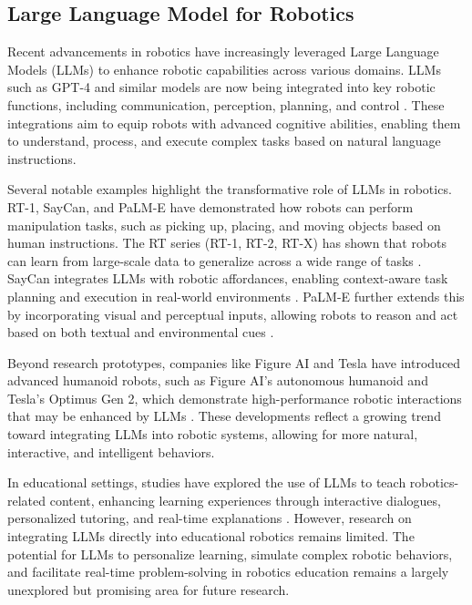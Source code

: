 \subsection{Large Language Model for Robotics}

Recent advancements in robotics have increasingly leveraged Large Language Models (LLMs) to enhance robotic capabilities across various domains. LLMs such as GPT-4 and similar models are now being integrated into key robotic functions, including communication, perception, planning, and control \cite{wang2024large}\cite{kim2024survey}\cite{zeng2023large}. These integrations aim to equip robots with advanced cognitive abilities, enabling them to understand, process, and execute complex tasks based on natural language instructions.

Several notable examples highlight the transformative role of LLMs in robotics. RT-1, SayCan, and PaLM-E have demonstrated how robots can perform manipulation tasks, such as picking up, placing, and moving objects based on human instructions. The RT series (RT-1, RT-2, RT-X) has shown that robots can learn from large-scale data to generalize across a wide range of tasks \cite{DBLP:conf/rss/BrohanBCCDFGHHH23}\cite{pmlr-v229-zitkovich23a}\cite{vuong2023open}. SayCan integrates LLMs with robotic affordances, enabling context-aware task planning and execution in real-world environments \cite{Ahn2022DoAI}. PaLM-E further extends this by incorporating visual and perceptual inputs, allowing robots to reason and act based on both textual and environmental cues \cite{Driess2023PaLMEAE}.

Beyond research prototypes, companies like Figure AI and Tesla have introduced advanced humanoid robots, such as Figure AI’s autonomous humanoid and Tesla’s Optimus Gen 2, which demonstrate high-performance robotic interactions that may be enhanced by LLMs \cite{figure_ai}\cite{tesla_optimus_gen2}. These developments reflect a growing trend toward integrating LLMs into robotic systems, allowing for more natural, interactive, and intelligent behaviors.

In educational settings, studies have explored the use of LLMs to teach robotics-related content, enhancing learning experiences through interactive dialogues, personalized tutoring, and real-time explanations \cite{Kahl2024}\cite{shu2024llms}. However, research on integrating LLMs directly into educational robotics remains limited. The potential for LLMs to personalize learning, simulate complex robotic behaviors, and facilitate real-time problem-solving in robotics education remains a largely unexplored but promising area for future research.